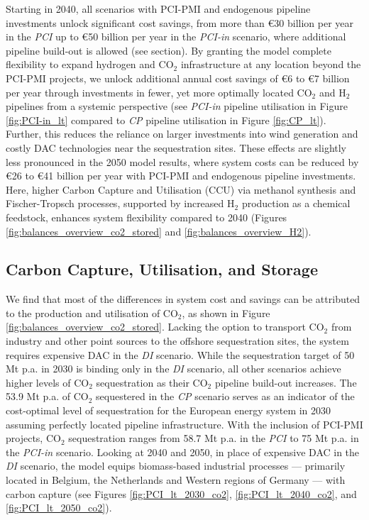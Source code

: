 \documentclass[pdflatex,sn-nature]{sn-jnl}
\theoremstyle{thmstyleone}%
\theoremstyle{thmstyletwo}%
\theoremstyle{thmstylethree}%
\begin{document}
Starting in 2040, all scenarios with PCI-PMI and endogenous pipeline investments unlock significant cost savings, from more than €30 billion per year in the \textit{PCI} up to €50 billion per year in the \textit{PCI-in} scenario, where additional pipeline build-out is allowed (see  section).
By granting the model complete flexibility to expand hydrogen and CO$_2$ infrastructure at any location beyond the PCI-PMI projects, we unlock additional annual cost savings of €6 to €7 billion per year through investments in fewer, yet more optimally located CO$_2$ and H$_2$ pipelines from a systemic perspective (see \textit{PCI-in} pipeline utilisation in Figure \ref{fig:PCI-in_lt} compared to \textit{CP} pipeline utilisation in Figure \ref{fig:CP_lt}).
Further, this reduces the reliance on larger investments into wind generation and costly DAC technologies near the sequestration sites. These effects are slightly less pronounced in the 2050 model results, where system costs can be reduced by €26 to €41 billion per year with PCI-PMI and endogenous pipeline investments. Here, higher Carbon Capture and Utilisation (CCU) via methanol synthesis and Fischer-Tropsch processes, supported by increased H$_2$ production as a chemical feedstock, enhances system flexibility compared to 2040 (Figures \ref{fig:balances_overview_co2_stored} and \ref{fig:balances_overview_H2}).

\subsection{Carbon Capture, Utilisation, and Storage}
We find that most of the differences in system cost and savings can be attributed to the production and utilisation of CO$_2$, as shown in Figure \ref{fig:balances_overview_co2_stored}. Lacking the option to transport CO$_2$ from industry and other point sources to the offshore sequestration sites, the system requires expensive DAC in the \textit{DI} scenario. While the sequestration target of 50 Mt p.a. in 2030 is binding only in the \textit{DI} scenario, all other scenarios achieve higher levels of CO$_2$ sequestration as their CO$_2$ pipeline build-out increases. 
The 53.9 Mt p.a. of CO$_2$ sequestered in the \textit{CP} scenario serves as an indicator of the cost-optimal level of sequestration for the European energy system in 2030 assuming perfectly located pipeline infrastructure. With the inclusion of PCI-PMI projects, CO$_2$ sequestration ranges from 58.7 Mt p.a. in the \textit{PCI} to 75 Mt p.a. in the \textit{PCI-in} scenario. 
Looking at 2040 and 2050, in place of expensive DAC in the \textit{DI} scenario, the model equips biomass-based industrial processes --- primarily located in Belgium, the Netherlands and Western regions of Germany --- with carbon capture (see Figures \ref{fig:PCI_lt_2030_co2}, \ref{fig:PCI_lt_2040_co2}, and \ref{fig:PCI_lt_2050_co2}). 
\end{document}

